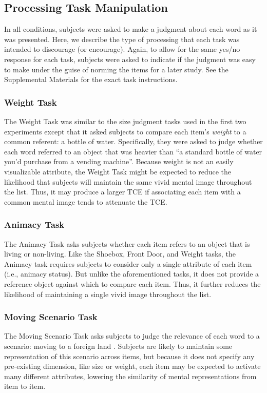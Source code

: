 \documentclass[jou,natbib,floatsintext]{apa6} %
\begin{document}
\subsection{Processing Task Manipulation}
In all conditions, subjects were asked to make a judgment about each word as it was presented. Here, we describe the type of processing that each task was intended to discourage (or encourage). Again, to allow for the same yes/no response for each task, subjects were asked to indicate if the judgment was easy to make under the guise of norming the items for a later study. See the Supplemental Materials for the exact task instructions.

\subsubsection{Weight Task} The Weight Task was similar to the size judgment tasks used in the first two experiments except that it asked subjects to compare each item's \emph{weight} to a common referent: a bottle of water. Specifically, they were asked to judge whether each word referred to an object that was heavier than ``a standard bottle of water you'd purchase from a vending machine''. Because weight is not an easily visualizable attribute, the Weight Task might be expected to reduce the likelihood that subjects will maintain the same vivid mental image throughout the list. Thus, it may produce a larger TCE if associating each item with a common mental image tends to attenuate the TCE.

\subsubsection{Animacy Task} The Animacy Task asks subjects whether each item refers to an object that is living or non-living. Like the Shoebox, Front Door, and Weight tasks, the Animacy task requires subjects to consider only a single attribute of each item (i.e., animacy status). But unlike the aforementioned tasks, it does not provide a reference object against which to compare each item. Thus, it further reduces the likelihood of maintaining a single vivid image throughout the list. 

\subsubsection{Moving Scenario Task} The Moving Scenario Task asks subjects to judge the relevance of each word to a scenario: moving to a foreign land \citep{NairEtal17}. Subjects are likely to maintain some representation of this scenario across items, but because it does not specify any pre-existing dimension, like size or weight, each item may be expected to activate many different attributes, lowering the similarity of mental representations from item to item.
\end{document}
